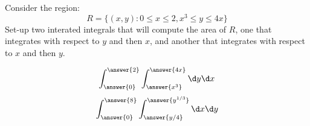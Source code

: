 \documentclass{ximera}
\author{Bart Snapp}
\begin{document}
\begin{exercise}
  Consider the region:
  \[
  R=\{(x,y): 0\le x\le 2, x^3\le y\le 4x\}
  \]
  Set-up two interated integrals that will compute the area of $R$,
  one that integrates with respect to $y$ and then $x$, and another
  that integrates with respect to $x$ and then $y$.
  \begin{prompt}
    \[
    \int_{\answer{0}}^{\answer{2}} \int_{\answer{x^3}}^{\answer{4x}} \d y \d x
    \]
    \[
    \int_{\answer{0}}^{\answer{8}} \int_{\answer{y/4}}^{\answer{y^{1/3}}} \d x \d y
    \]
  \end{prompt}
\end{exercise}
\end{document}

